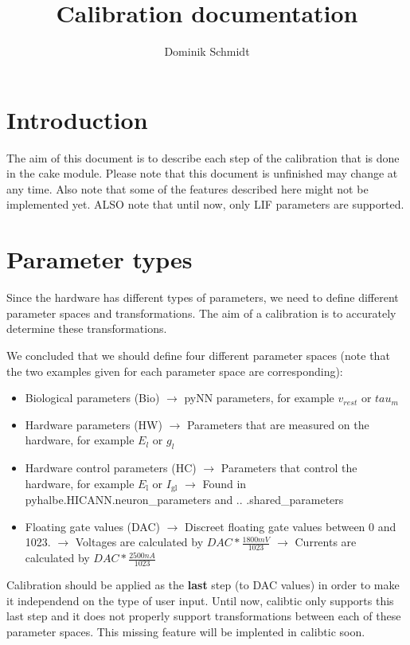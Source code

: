 \documentclass[12pt,a4paper,bibliography=totocnumbered,listof=totocnumbered]{scrartcl}
\author{Dominik Schmidt}
\title{Calibration documentation}
\begin{document}
\maketitle
\section{Introduction}
The aim of this document is to describe each step of the calibration that is done in the cake module.
Please note that this document is unfinished may change at any time.
Also note that some of the features described here might not be implemented yet. 
ALSO note that until now, only LIF parameters are supported.

\section{Parameter types}
Since the hardware has different types of parameters, we need to define different parameter spaces and transformations.
The aim of a calibration is to accurately determine these transformations.

We concluded that we should define four different parameter spaces (note that the two examples given for each parameter space are corresponding):
\begin{itemize}
\item Biological parameters (Bio)
\subitem $\rightarrow$ pyNN parameters, for example $v_{rest}$ or $tau_m$
\item Hardware parameters (HW)
\subitem $\rightarrow$ Parameters that are measured on the hardware, for example $E_l$ or $g_l$
\item Hardware control parameters (HC)
\subitem $\rightarrow$ Parameters that control the hardware, for example $E_\text{l}$ or $I_\text{gl}$
\subitem $\rightarrow$ Found in pyhalbe.HICANN.neuron\_parameters and .. .shared\_parameters
\item Floating gate values (DAC)
\subitem $\rightarrow$ Discreet floating gate values between 0 and 1023.
\subitem $\rightarrow$ Voltages are calculated by $DAC * \frac{1800 mV}{1023}$
\subitem $\rightarrow$ Currents are calculated by $DAC * \frac{2500 nA}{1023}$
\end{itemize}
 
Calibration should be applied as the \textbf{last} step (to DAC values) in order to make it independend on the type of user input.
Until now, calibtic only supports this last step and it does not properly support transformations between each of these parameter spaces.
This missing feature will be implented in calibtic soon.
\end{document}
